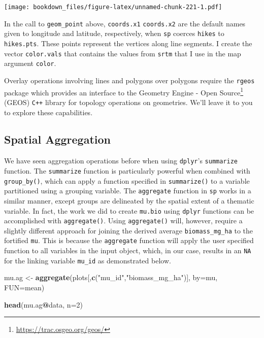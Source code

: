 \documentclass[
]{krantz}
\makeatletter
\newenvironment{Shaded}{\begin{snugshade}}{\end{snugshade}}
\newcommand{\DataTypeTok}[1]{\textcolor[rgb]{0.27,0.27,0.27}{#1}}
\newcommand{\DecValTok}[1]{\textcolor[rgb]{0.06,0.06,0.06}{#1}}
\newcommand{\KeywordTok}[1]{\textcolor[rgb]{0.27,0.27,0.27}{\textbf{#1}}}
\newcommand{\NormalTok}[1]{#1}
\newcommand{\OperatorTok}[1]{\textcolor[rgb]{0.43,0.43,0.43}{\textbf{#1}}}
\newcommand{\StringTok}[1]{\textcolor[rgb]{0.5,0.5,0.5}{#1}}
\renewcommand{\href}[2]{#2\footnote{\url{#1}}}
\newenvironment{kframe}{%
\medskip{}
\setlength{\fboxsep}{.8em}
 \def\at@end@of@kframe{}%
 \ifinner\ifhmode%
  \def\at@end@of@kframe{\end{minipage}}%
  \begin{minipage}{\columnwidth}%
 \fi\fi%
 \def\FrameCommand##1{\hskip\@totalleftmargin \hskip-\fboxsep
 \colorbox{shadecolor}{##1}\hskip-\fboxsep
     \hskip-\linewidth \hskip-\@totalleftmargin \hskip\columnwidth}%
 \MakeFramed {\advance\hsize-\width
   \@totalleftmargin\z@ \linewidth\hsize
   \@setminipage}}%
 {\par\unskip\endMakeFramed%
 \at@end@of@kframe}
\renewenvironment{Shaded}{\begin{kframe}}{\end{kframe}}
\makeatother
\begin{document}
\texttt{[image: bookdown\_files/figure-latex/unnamed-chunk-221-1.pdf]}

In the call to \texttt{geom\_point} above, \texttt{coords.x1} \texttt{coords.x2} are the default names given to longitude and latitude, respectively, when \texttt{sp} coerces \texttt{hikes} to \texttt{hikes.pts}. These points represent the vertices along line segments. I create the vector \texttt{color.vals} that contains the values from \texttt{srtm} that I use in the map argument \texttt{color}.

Overlay operations involving lines and polygons over polygons require the \texttt{rgeos} package which provides an interface to the \href{https://trac.osgeo.org/geos/}{Geometry Engine - Open Source} (GEOS) \texttt{C++} library for topology operations on geometries. We'll leave it to you to explore these capabilities.

\hypertarget{spatial-aggregation}{%
\subsection{Spatial Aggregation}\label{spatial-aggregation}}

We have seen aggregation operations before when using \texttt{dplyr}'s \texttt{summarize} function. The \texttt{summarize} function is particularly powerful when combined with \texttt{group\_by()}, which can apply a function specified in \texttt{summarize()} to a variable partitioned using a grouping variable. The \texttt{aggregate} function in \texttt{sp} works in a similar manner, except groups are delineated by the spatial extent of a thematic variable. In fact, the work we did to create \texttt{mu.bio} using \texttt{dplyr} functions can be accomplished with \texttt{aggregate()}. Using \texttt{aggregate()} will, however, require a slightly different approach for joining the derived average \texttt{biomass\_mg\_ha} to the fortified \texttt{mu}. This is because the \texttt{aggregate} function will apply the user specified function to all variables in the input object, which, in our case, results in an \texttt{NA} for the linking variable \texttt{mu\_id} as demonstrated below.

\begin{Shaded}
\begin{Highlighting}[]
\NormalTok{mu.ag \textless{}{-}}\StringTok{ }\KeywordTok{aggregate}\NormalTok{(plots[,}\KeywordTok{c}\NormalTok{(}\StringTok{"mu\_id"}\NormalTok{,}\StringTok{"biomass\_mg\_ha"}\NormalTok{)], }\DataTypeTok{by=}\NormalTok{mu, }\DataTypeTok{FUN=}\NormalTok{mean)}

\KeywordTok{head}\NormalTok{(mu.ag}\OperatorTok{@}\NormalTok{data, }\DataTypeTok{n=}\DecValTok{2}\NormalTok{)}
\end{Highlighting}
\end{Shaded}
\end{document}
